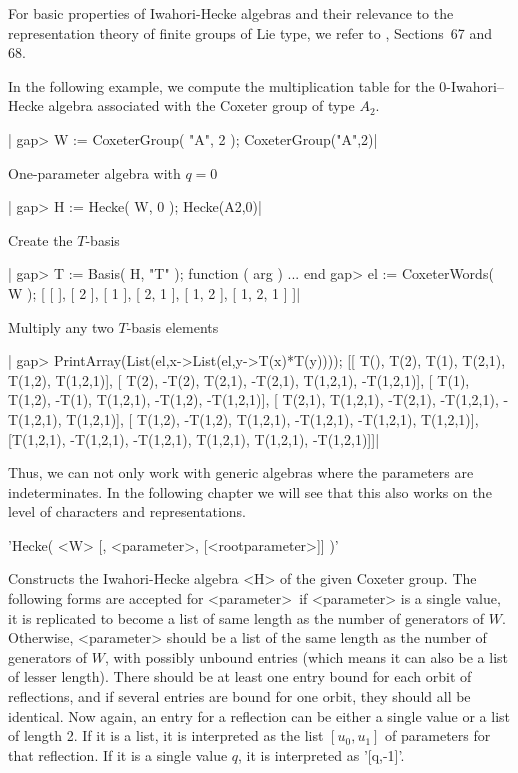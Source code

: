 For basic properties of Iwahori-Hecke algebras and their relevance to the
representation   theory of  finite groups  of   Lie  type,   we refer  to
\cite{CR87}, Sections~67 and 68.

In the  following example, we  compute  the multiplication table for  the
$0$-Iwahori--Hecke algebra  associated  with  the Coxeter group   of type
$A_2$.

|    gap> W := CoxeterGroup( "A", 2 );
    CoxeterGroup("A",2)|

One-parameter algebra with $q=0$\:

|    gap> H := Hecke( W, 0 );
    Hecke(A2,0)|

Create the $T$-basis\:

|    gap> T := Basis( H, "T" );
    function ( arg ) ... end
    gap> el := CoxeterWords( W );
    [ [  ], [ 2 ], [ 1 ], [ 2, 1 ], [ 1, 2 ], [ 1, 2, 1 ] ]|

Multiply any two $T$-basis elements\:

|    gap> PrintArray(List(el,x->List(el,y->T(x)*T(y))));
    [[     T(),      T(2),      T(1),    T(2,1),    T(1,2),  T(1,2,1)],
     [    T(2),     -T(2),    T(2,1),   -T(2,1),  T(1,2,1), -T(1,2,1)],
     [    T(1),    T(1,2),     -T(1),  T(1,2,1),   -T(1,2), -T(1,2,1)],
     [  T(2,1),  T(1,2,1),   -T(2,1), -T(1,2,1), -T(1,2,1),  T(1,2,1)],
     [  T(1,2),   -T(1,2),  T(1,2,1), -T(1,2,1), -T(1,2,1),  T(1,2,1)],
     [T(1,2,1), -T(1,2,1), -T(1,2,1),  T(1,2,1),  T(1,2,1), -T(1,2,1)]]|

Thus, we can not only work with generic algebras where the parameters are
indeterminates. In the following chapter we will see that this also works
on the level of characters and representations.

'Hecke( <W> [, <parameter>, [<rootparameter>]] )'

Constructs  the Iwahori-Hecke algebra  <H> of the  given Coxeter group. The
following  forms are accepted for <parameter>\:\ if <parameter> is a single
value,  it is replicated to  become a list of  same length as the number of
generators  of $W$.  Otherwise, <parameter>  should be  a list  of the same
length  as the number  of generators of  $W$, with possibly unbound entries
(which  means it can also  be a list of  lesser length). There should be at
least one entry bound for each orbit of reflections, and if several entries
are  bound for one orbit, they should all be identical. Now again, an entry
for  a reflection can be either a single value or a list of length 2. If it
is a list, it is interpreted as the list $[u_0,u_1]$ of parameters for that
reflection. If it is a single value $q$, it is interpreted as '[q,-1]'.

